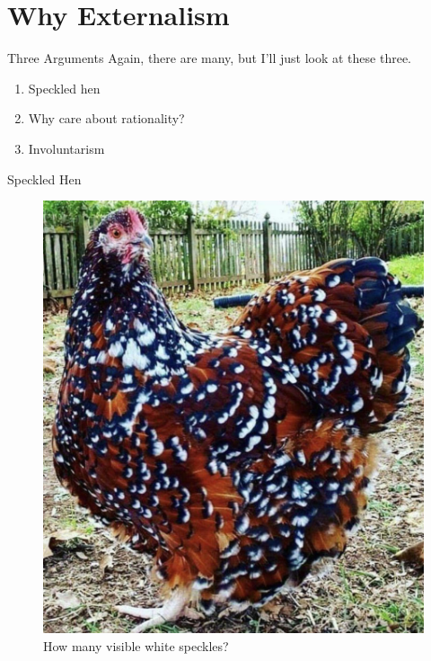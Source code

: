 \documentclass[
  17pt,
  letterpaper,
  ignorenonframetext,
  aspectratio=169,
]{beamer}
\providecommand{\tightlist}{%
  \setlength{\itemsep}{0pt}\setlength{\parskip}{0pt}}\usepackage{longtable,booktabs,array}
\begin{document}
\hypertarget{why-externalism}{%
\section{Why Externalism}\label{why-externalism}}

\begin{frame}{Three Arguments}
\protect\hypertarget{three-arguments}{}
Again, there are many, but I'll just look at these three.

\begin{enumerate}[<+->]
\tightlist
\item
  Speckled hen
\item
  Why care about rationality?
\item
  Involuntarism
\end{enumerate}
\end{frame}

\begin{frame}{Speckled Hen}
\protect\hypertarget{speckled-hen}{}
\begin{figure}

{\centering \includegraphics[width=\textwidth,height=0.6\textheight]{../images/hen.jpg}

}

\caption{How many visible white speckles?}

\end{figure}
\end{frame}
\end{document}
